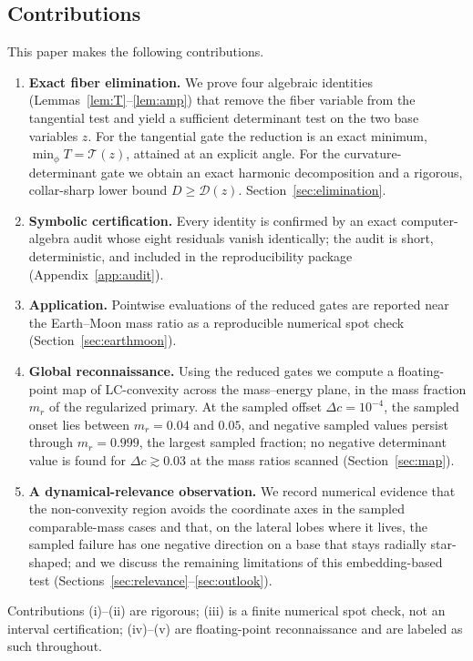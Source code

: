 \documentclass[11pt,reqno]{amsart}
\theoremstyle{plain}
\theoremstyle{definition}
\newcommand{\calT}{\mathcal{T}}
\newcommand{\calD}{\mathcal{D}}
\begin{document}
\subsection{Contributions}
This paper makes the following contributions.
\begin{enumerate}
\item[(i)] \textbf{Exact fiber elimination.} We prove four algebraic identities (Lemmas~\ref{lem:T}--\ref{lem:amp}) that remove the fiber variable from the tangential test and yield a sufficient determinant test on the two base variables $z$. For the tangential gate the reduction is an exact minimum, $\min_\phi T=\calT(z)$, attained at an explicit angle. For the curvature-determinant gate we obtain an exact harmonic decomposition and a rigorous, collar-sharp lower bound $D\ge\calD(z)$. Section~\ref{sec:elimination}.
\item[(ii)] \textbf{Symbolic certification.} Every identity is confirmed by an exact computer-algebra audit whose eight residuals vanish identically; the audit is short, deterministic, and included in the reproducibility package (Appendix~\ref{app:audit}).
\item[(iii)] \textbf{Application.} Pointwise evaluations of the reduced gates are reported near the Earth--Moon mass ratio as a reproducible numerical spot check (Section~\ref{sec:earthmoon}).
\item[(iv)] \textbf{Global reconnaissance.} Using the reduced gates we compute a floating-point map of LC-convexity across the mass--energy plane, in the mass fraction $m_r$ of the regularized primary. At the sampled offset $\Delta c=10^{-4}$, the sampled onset lies between $m_r=0.04$ and $0.05$, and negative sampled values persist through $m_r=0.999$, the largest sampled fraction; no negative determinant value is found for $\Delta c\gtrsim 0.03$ at the mass ratios scanned (Section~\ref{sec:map}).
\item[(v)] \textbf{A dynamical-relevance observation.} We record numerical evidence that the non-convexity region avoids the coordinate axes in the sampled comparable-mass cases and that, on the lateral lobes where it lives, the sampled failure has one negative direction on a base that stays radially star-shaped; and we discuss the remaining limitations of this embedding-based test (Sections~\ref{sec:relevance}--\ref{sec:outlook}).
\end{enumerate}
Contributions (i)--(ii) are rigorous; (iii) is a finite numerical spot check, not an interval certification; (iv)--(v) are floating-point reconnaissance and are labeled as such throughout.
\end{document}
